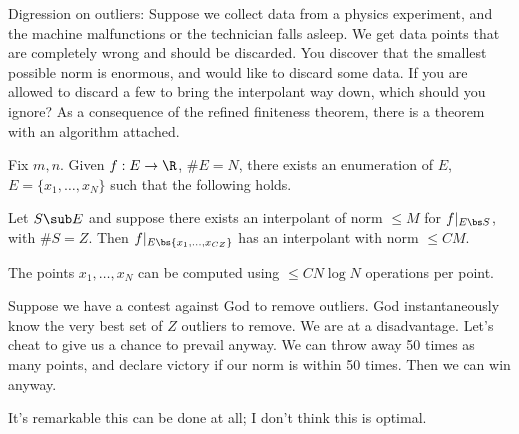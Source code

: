 Digression on outliers: 
Suppose we collect data from a physics experiment, and the machine malfunctions or the technician falls asleep. We get data points that are completely wrong and should be discarded.
You discover that the smallest possible norm is enormous, and would like to discard some data. If you are allowed to discard a few to bring the interpolant way down, which should you ignore? As a consequence of the refined finiteness theorem, there is a theorem with an algorithm attached.
\begin{thm}
Fix $m,n$. Given $f:E\to \R$, $\#E=N$, there exists an enumeration of $E$, $E=\{x_1,\ldots, x_N\}$ such that the following holds.

Let $S\sub E$ and suppose there exists an interpolant of norm $\le M$ for $f|_{E\bs S}$, with $\#S=Z$.
Then $f|_{E\bs \{x_1,\ldots, x_{CZ}\}}$ has an interpolant with norm $\le CM$. 

The points $x_1,\ldots, x_N$ can be computed using $\le CN\log N$ operations per point.
\end{thm}
Suppose we have a contest against God to remove outliers. God instantaneously know the very best set of $Z$ outliers to remove. We are at a disadvantage. Let's cheat to give us a chance to prevail anyway. We can throw away 50 times as many points, and declare victory if our norm is within 50 times. Then we can win anyway.

It's remarkable this can be done at all; I don't think this is optimal. 

